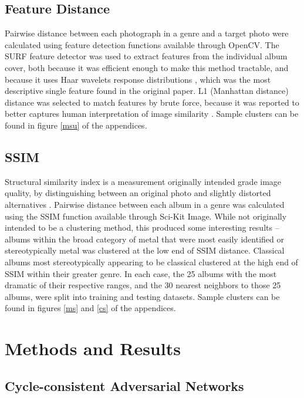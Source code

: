 \documentclass{article}
\begin{document}
\subsection{Feature Distance}

Pairwise distance between each photograph in a genre and a target photo were calculated using feature detection functions available through OpenCV. The SURF feature detector was used to extract features from the individual album cover, both because it was efficient enough to make this method tractable, and because it uses Haar wavelets response distributions \cite{cite-key2}, which was the most descriptive single feature found in the original paper. L1 (Manhattan distance) distance was selected to match features by brute force, because it was reported to better captures human interpretation of image similarity \cite{Sinha06facerecognition}. Sample clusters can be found in figure \ref{msu} of the appendices.

\subsection{SSIM}

Structural similarity index is a measurement originally intended grade image quality, by distinguishing between an original photo and slightly distorted alternatives \cite{1284395}. Pairwise distance between each album in a genre was calculated using the SSIM function available through Sci-Kit Image. While not originally intended to be a clustering method, this produced some interesting results – albums within the broad category of metal that were most easily identified or stereotypically metal was clustered at the low end of SSIM distance. Classical albums most stereotypically appearing to be classical clustered at the high end of SSIM within their greater genre. In each case, the 25 albums with the most dramatic of their respective ranges, and the 30 nearest neighbors to those 25 albums, were split into training and testing datasets. Sample clusters can be found in figures \ref{ms} and \ref{cs} of the appendices.

\section{Methods and Results}

\subsection{Cycle-consistent Adversarial Networks}
\end{document}
